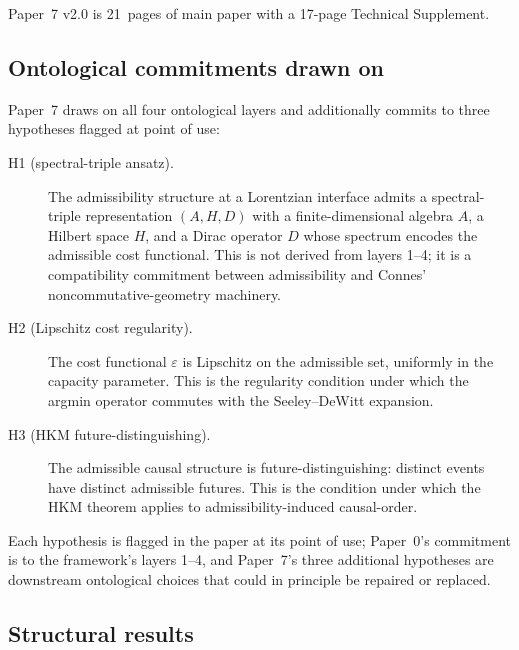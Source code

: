 \documentclass[11pt]{article}
\begin{document}
Paper~7 v2.0 is 21~pages of main paper with a 17-page Technical Supplement.

\subsection{Ontological commitments drawn on}\label{sec:P7_commitments}

Paper~7 draws on all four ontological layers and additionally commits to three hypotheses flagged at point of use:

\begin{description}
    \item[H1 (spectral-triple ansatz).] The admissibility structure at a Lorentzian interface admits a spectral-triple representation $(A, H, D)$ with a finite-dimensional algebra $A$, a Hilbert space $H$, and a Dirac operator $D$ whose spectrum encodes the admissible cost functional. This is not derived from layers 1--4; it is a compatibility commitment between admissibility and Connes' noncommutative-geometry machinery.
    \item[H2 (Lipschitz cost regularity).] The cost functional $\varepsilon$ is Lipschitz on the admissible set, uniformly in the capacity parameter. This is the regularity condition under which the argmin operator commutes with the Seeley--DeWitt expansion.
    \item[H3 (HKM future-distinguishing).] The admissible causal structure is future-distinguishing: distinct events have distinct admissible futures. This is the condition under which the HKM theorem applies to admissibility-induced causal-order.
\end{description}

\noindent Each hypothesis is flagged in the paper at its point of use; Paper~0's commitment is to the framework's layers 1--4, and Paper~7's three additional hypotheses are downstream ontological choices that could in principle be repaired or replaced.

\subsection{Structural results}\label{sec:P7_results}
\end{document}
